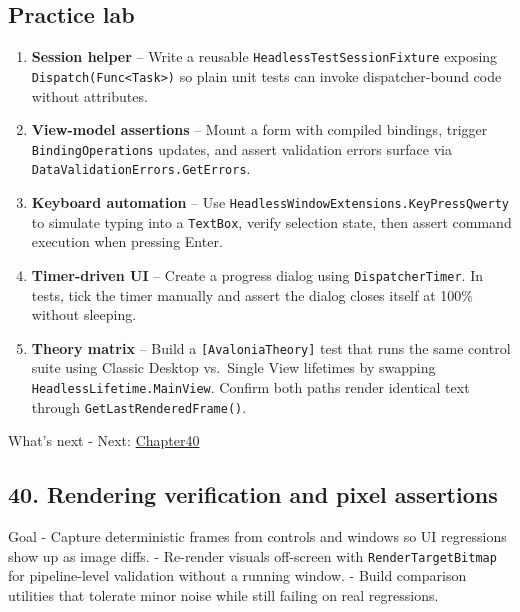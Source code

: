 \subsection{Practice lab}\label{practice-lab-6}

\begin{enumerate}
\def\labelenumi{\arabic{enumi}.}
\tightlist
\item
  \textbf{Session helper} -- Write a reusable
  \passthrough{\lstinline!HeadlessTestSessionFixture!} exposing
  \passthrough{\lstinline!Dispatch(Func<Task>)!} so plain unit tests can
  invoke dispatcher-bound code without attributes.
\item
  \textbf{View-model assertions} -- Mount a form with compiled bindings,
  trigger \passthrough{\lstinline!BindingOperations!} updates, and
  assert validation errors surface via
  \passthrough{\lstinline!DataValidationErrors.GetErrors!}.
\item
  \textbf{Keyboard automation} -- Use
  \passthrough{\lstinline!HeadlessWindowExtensions.KeyPressQwerty!} to
  simulate typing into a \passthrough{\lstinline!TextBox!}, verify
  selection state, then assert command execution when pressing Enter.
\item
  \textbf{Timer-driven UI} -- Create a progress dialog using
  \passthrough{\lstinline!DispatcherTimer!}. In tests, tick the timer
  manually and assert the dialog closes itself at 100\% without
  sleeping.
\item
  \textbf{Theory matrix} -- Build a
  \passthrough{\lstinline![AvaloniaTheory]!} test that runs the same
  control suite using Classic Desktop vs.~Single View lifetimes by
  swapping \passthrough{\lstinline!HeadlessLifetime.MainView!}. Confirm
  both paths render identical text through
  \passthrough{\lstinline!GetLastRenderedFrame()!}.
\end{enumerate}

What's next - Next: \href{Chapter40.md}{Chapter40}

\newpage

\subsection{40. Rendering verification and pixel
assertions}\label{rendering-verification-and-pixel-assertions}

Goal - Capture deterministic frames from controls and windows so UI
regressions show up as image diffs. - Re-render visuals off-screen with
\passthrough{\lstinline!RenderTargetBitmap!} for pipeline-level
validation without a running window. - Build comparison utilities that
tolerate minor noise while still failing on real regressions.

